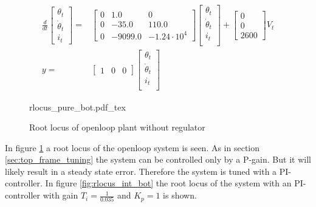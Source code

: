 \documentclass[../../../Main]{subfiles}
\begin{document}
\begin{equation}
      \label{eq:bottom_state_eq}
      \begin{split}
      \frac{d}{dt}
    \begin{bmatrix}
        \theta_t \\
        \dot \theta_t \\
        i_t
    \end{bmatrix}
    =&
    \begin{bmatrix}0 & 1.0 & 0\\ 0 & -35.0 & 110.0\\ 0 & -9099.0 & -1.24\cdot10^4\end{bmatrix}
    \begin{bmatrix}
        \theta_t \\
        \dot \theta_t \\
        i_t \\
    \end{bmatrix}
    +
    \begin{bmatrix}
      0\\ 0\\ 2600
    \end{bmatrix}
    V_t
\\
      y =&
    \begin{bmatrix}
        1 & 0 & 0
    \end{bmatrix}
    \begin{bmatrix}
        \theta_t \\
        \dot \theta_t\\
        i_t\\
    \end{bmatrix}
    \end{split}
\end{equation}


\begin{figure}[H]
\centering
\def\svgwidth{\textwidth}
{rlocus_pure_bot.pdf_tex}
\caption{Root locus of openloop plant without regulator}
\label{fig:rlocus_pure_bot}
\end{figure}

In figure \ref{fig:rlocus_pure_bot} a root locus of the openloop system is seen. As in section \ref{sec:top_frame_tuning} the system can be controlled only by a P-gain. 
But it will likely result in a steady state error. 
Therefore the system is tuned with a PI-controller. In figure \ref{fig:rlocus_int_bot} the root locus of the system with an PI-controller with gain $T_i = \frac{1}{0.035}$ and $K_p= 1$ is shown.
\end{document}
